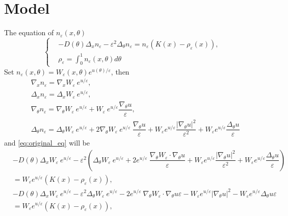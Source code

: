 \documentclass{article}
\begin{document}
\section{Model}
The equation of $n_\varepsilon (x,\theta)$
\begin{equation}\label{eq:original_eq}
\left\{
\begin{aligned}
&-D(\theta)\Delta_x n_\varepsilon -\varepsilon^2\Delta_\theta n_\varepsilon = n_\varepsilon(K(x)-\rho_\varepsilon(x)),\\
&\rho_\varepsilon = \int_0^1n_\varepsilon(x,\theta) d\theta
\end{aligned}
\right.
\end{equation}
Set $n_\varepsilon(x,\theta) = W_\varepsilon(x,\theta) e^{u(\theta)/\varepsilon}$, then
\begin{equation}
\begin{aligned}
&\nabla_x n_\varepsilon = \nabla_x W_\varepsilon ~e^{u/\varepsilon},\\
&\Delta_x n_\varepsilon = \Delta_x W_\varepsilon ~e^{u/\varepsilon},\\
&\nabla_\theta n_\varepsilon = \nabla_\theta W_\varepsilon ~e^{u/\varepsilon} + W_\varepsilon ~e^{u/\varepsilon} \dfrac{\nabla_\theta u}{\varepsilon},\\
&\Delta_\theta n_\varepsilon = \Delta_\theta W_\varepsilon ~e^{u/\varepsilon} + 2\nabla_\theta W_\varepsilon~e^{u/\varepsilon}~\dfrac{\nabla_\theta u}{\varepsilon} + W_\varepsilon e^{u/\varepsilon}\dfrac{|\nabla_\theta u|^2}{\varepsilon^2} + W_\varepsilon e^{u/\varepsilon}\dfrac{\Delta_\theta u}{\varepsilon}
\end{aligned}
\end{equation}
and \eqref{eq:original_eq} will be
\begin{equation}
\begin{aligned}
&-D(\theta)\Delta_x W_\varepsilon ~e^{u/\varepsilon} -\varepsilon^2\left(\Delta_\theta W_\varepsilon ~e^{u/\varepsilon} + 2e^{u/\varepsilon}~\dfrac{\nabla_\theta W_\varepsilon\cdot \nabla_\theta u}{\varepsilon} + W_\varepsilon e^{u/\varepsilon}\dfrac{|\nabla_\theta u|^2}{\varepsilon^2} + W_\varepsilon e^{u/\varepsilon}\dfrac{\Delta_\theta u}{\varepsilon}\right)\\
&= W_\varepsilon e^{u/\varepsilon}(K(x)-\rho_\varepsilon(x)),\\
&-D(\theta)\Delta_x W_\varepsilon ~e^{u/\varepsilon} -\varepsilon^2\Delta_\theta W_\varepsilon ~e^{u/\varepsilon} - 2e^{u/\varepsilon}~\nabla_\theta W_\varepsilon\cdot \nabla_\theta u\varepsilon - W_\varepsilon e^{u/\varepsilon}|\nabla_\theta u|^2 - W_\varepsilon e^{u/\varepsilon}\Delta_\theta u\varepsilon\\
&= W_\varepsilon e^{u/\varepsilon}(K(x)-\rho_\varepsilon(x)),\\
\end{aligned}
\end{equation}
\end{document}
